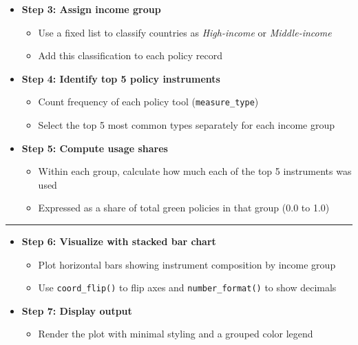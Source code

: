 \documentclass[
  letterpaper,
  DIV=11,
  numbers=noendperiod]{scrartcl}
\providecommand{\tightlist}{%
  \setlength{\itemsep}{0pt}\setlength{\parskip}{0pt}}
\begin{document}
\begin{itemize}
\item
  \textbf{Step 3: Assign income group}

  \begin{itemize}
  \tightlist
  \item
    Use a fixed list to classify countries as \emph{High-income} or
    \emph{Middle-income}
  \item
    Add this classification to each policy record
  \end{itemize}
\item
  \textbf{Step 4: Identify top 5 policy instruments}

  \begin{itemize}
  \tightlist
  \item
    Count frequency of each policy tool (\texttt{measure\_type})
  \item
    Select the top 5 most common types separately for each income group
  \end{itemize}
\item
  \textbf{Step 5: Compute usage shares}

  \begin{itemize}
  \tightlist
  \item
    Within each group, calculate how much each of the top 5 instruments
    was used
  \item
    Expressed as a share of total green policies in that group (0.0 to
    1.0)
  \end{itemize}
\end{itemize}

\begin{center}\rule{0.5\linewidth}{0.5pt}\end{center}

\begin{itemize}
\item
  \textbf{Step 6: Visualize with stacked bar chart}

  \begin{itemize}
  \tightlist
  \item
    Plot horizontal bars showing instrument composition by income group
  \item
    Use \texttt{coord\_flip()} to flip axes and
    \texttt{number\_format()} to show decimals
  \end{itemize}
\item
  \textbf{Step 7: Display output}

  \begin{itemize}
  \tightlist
  \item
    Render the plot with minimal styling and a grouped color legend
  \end{itemize}
\end{itemize}
\end{document}
